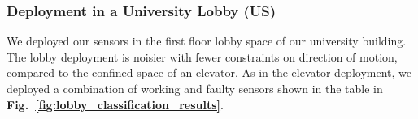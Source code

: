 
\subsubsection{Deployment in a University Lobby (US)}\label{subsubsec:lobby} We deployed our sensors %
in the first floor lobby space of our university building. 
%
The lobby deployment is noisier with fewer constraints on direction of motion, compared to the confined space of an elevator.
%
As in the elevator deployment, we deployed a combination of working and faulty sensors shown in the table in {\bfseries Fig.~\ref{fig:lobby_classification_results}}. 



